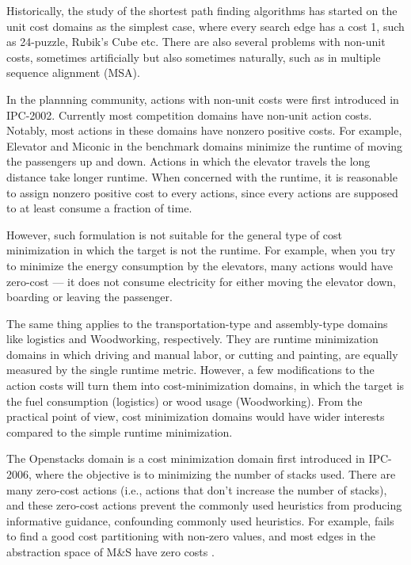 Historically, the study of the shortest path finding algorithms has
started on the unit cost domains as the simplest case, where every
search edge has a cost 1,
such as 24-puzzle, Rubik's Cube etc.
There are also several problems with non-unit costs, sometimes
artificially but also sometimes naturally, such as in multiple
sequence alignment (MSA).

In the plannning community, actions with non-unit costs were first introduced in 
IPC-2002. Currently most competition domains have non-unit action costs.
Notably, most actions in these domains have nonzero positive costs.
% 
% 
% 
For example, Elevator and Miconic in the benchmark domains minimize the
runtime of moving the passengers up and down.  Actions in which the
elevator travels the long distance take longer runtime.  When concerned
with the runtime, it is reasonable to assign nonzero positive cost to
every actions, since every actions are supposed to at least consume a
fraction of time.

However, such formulation is not suitable for the general type of cost
minimization in which the target is not the runtime.  For example, when
you try to minimize the energy consumption by the elevators, many
actions would have zero-cost --- it does not consume electricity for
either moving the elevator down, boarding or leaving the passenger.
 
The same thing applies to the transportation-type and assembly-type
domains like logistics and Woodworking, respectively. They are runtime
minimization domains in which driving and manual labor, or cutting and
painting, are equally measured by the single runtime metric.
% 
However, a few modifications to the action costs will turn them into
cost-minimization domains, in which the target is the fuel consumption
(logistics) or wood usage (Woodworking). From the practical point of
view, cost minimization domains would have wider interests compared to
the simple runtime minimization.

The Openstacks domain is a cost
minimization domain first introduced in IPC-2006, where the objective is to 
minimizing the number of stacks used.
There are many zero-cost actions (i.e., actions that don't increase the number of stacks), and
these zero-cost actions prevent the commonly used heuristics from producing
informative guidance, confounding commonly used heuristics.
For example, \lmcut \cite{Helmert2009} fails to find a good cost
partitioning with non-zero values, and most edges in the abstraction
space of M\&S have zero costs \cite{helmert2007flexible}.

